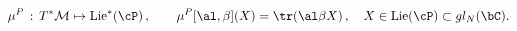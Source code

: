 \begin{equation}
\mu\sp{P}\, : \, T^*{\cal M} \mapsto {\rm Lie}^*(\cP)\,, \qquad 
\mu\sp{P}[\al,\beta](X)=\tr (\al\beta X)\,, \quad X\in {\rm Lie}(\cP)\subset gl_N(\bC).
\label{mParabol}
\end{equation}


